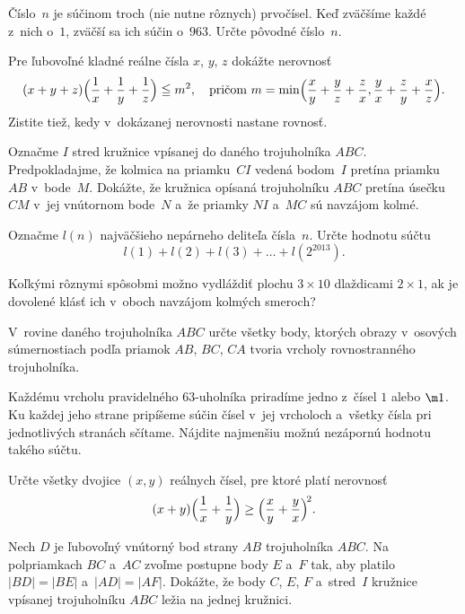 ﻿{%
Číslo~$n$ je súčinom troch (nie nutne rôznych) prvočísel.
Keď zväčšíme každé z~nich o~$1$, zväčší sa ich súčin o~$963$.
Určte pôvodné číslo~$n$.}

{%
Pre ľubovoľné kladné reálne čísla $x$, $y$, $z$ dokážte
nerovnosť
$$
(x+y+z)\Bigl(\frac{1}{x}+\frac{1}{y}+\frac{1}{z}\Bigr)\leqq m^2,\quad
\text{pričom}\ m=\min\Bigl(\frac{x}{y}+\frac{y}{z}+\frac{z}{x},
\frac{y}{x}+\frac{z}{y}+\frac{x}{z}\Bigr).
$$
Zistite tiež, kedy v~dokázanej nerovnosti nastane rovnosť.}

{%
Označme $I$ stred kružnice vpísanej do daného trojuholníka
$ABC$. Predpokladajme, že kolmica na priamku~$CI$
vedená bodom~$I$ pretína priamku~$AB$ v~bode~$M$.
Dokážte, že kružnica opísaná trojuholníku $ABC$ pretína
úsečku~$CM$ v~jej vnútornom bode~$N$ a~že priamky $NI$ a~$MC$
sú navzájom kolmé.}

{%
Označme $l(n)$ najväčšieho nepárneho deliteľa čísla~$n$. Určte
hodnotu súčtu
$$
l(1)+l(2)+l(3)+\dots+l(2^{2013}).
$$}

{%
Koľkými rôznymi spôsobmi možno vydláždiť plochu $3\times 10$
dlaždicami $2\times1$, ak je dovolené klásť ich v~oboch navzájom
kolmých smeroch?}

{%
V~rovine daného trojuholníka $ABC$ určte všetky body, ktorých
obrazy v~osových súmernostiach podľa priamok $AB$, $BC$, $CA$
tvoria vrcholy rovnostranného trojuholníka.}

{%
Každému vrcholu pravidelného 63-uholníka priradíme jedno z~čísel $1$ alebo $\m1$.
Ku každej jeho strane
pripíšeme súčin čísel v~jej vrcholoch a~všetky čísla pri jednotlivých stranách
sčítame. Nájdite najmenšiu možnú nezápornú hodnotu takého súčtu.}

{%
Určte všetky dvojice $(x, y)$ reálnych čísel, pre ktoré platí nerovnosť
$$
(x + y)\Bigl(\frac1x+\frac1y\Bigr)\ge\Bigl(\frac xy+\frac yx\Bigr)^{\!2}.
$$}

{%
Nech $D$ je ľubovoľný vnútorný bod strany $AB$ trojuholníka $ABC$. Na polpriamkach $BC$ a~$AC$
zvoľme postupne body $E$ a~$F$ tak, aby platilo $|BD| = |BE|$ a~$|AD| = |AF|$.
Dokážte, že body $C$, $E$, $F$ a~stred~$I$ kružnice vpísanej trojuholníku $ABC$ ležia
na jednej kružnici.}

